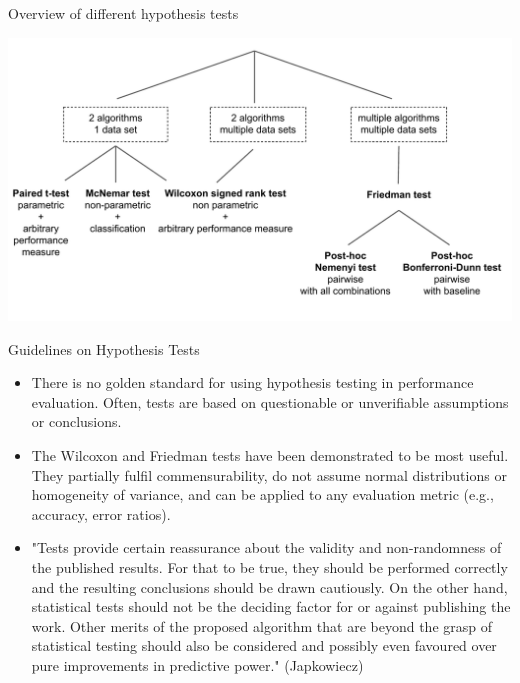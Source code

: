 \documentclass[11pt,compress,t,notes=noshow, aspectratio=169, xcolor=table]{beamer}
\begin{document}
\begin{frame}{Overview of different hypothesis tests}
\begin{center}\includegraphics[width = 1\textwidth]{figure/tests.pdf} \end{center}


\end{frame}


\begin{frame}{Guidelines on Hypothesis Tests}

\vfill
\begin{itemize}
    \item There is no golden standard for using hypothesis testing in performance evaluation. Often, tests are based on questionable or unverifiable assumptions or conclusions.
    \item The Wilcoxon and Friedman tests have been demonstrated to be most useful. They partially fulfil commensurability, do not assume normal distributions or homogeneity of variance, and can be applied to any evaluation metric (e.g., accuracy, error ratios).
    \item  "Tests provide certain reassurance about the validity and non-randomness of the published  results. For that to be true, they should be performed correctly and the resulting conclusions should  be drawn cautiously. On the other hand, statistical tests should not be the deciding factor for or  against publishing the work. Other merits of the proposed algorithm that are beyond the grasp of  statistical testing should also be considered and possibly even favoured over pure improvements in  predictive power." (Japkowiecz)
\end{itemize}
\vfill

\end{frame}
\end{document}
